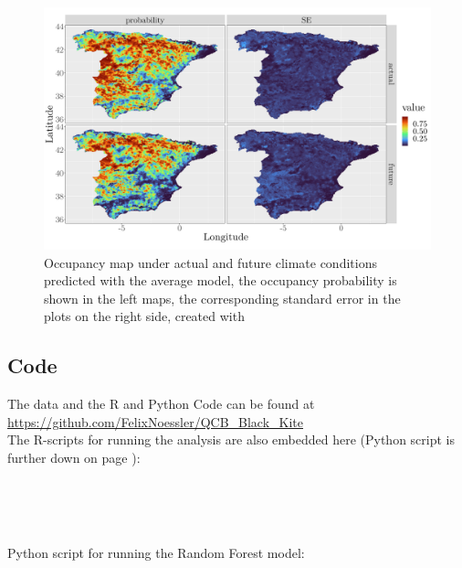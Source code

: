 \documentclass[12pt]{scrartcl} %
\begin{document}
\begin{figure}[H]
	\centering
	\includegraphics[width=\linewidth]{img/avg_model_map}
	\caption{Occupancy map under actual and future climate conditions predicted with the average model, the occupancy probability is shown in the left maps, the corresponding standard error in the plots on the right side, created with \textcite{ggplot2}}	
	\label{fig:avg_map}
\end{figure}

\newpage
\subsection*{Code}
The data and the R and Python Code can be found at \\ \url{https://github.com/FelixNoessler/QCB_Black_Kite} \\

\noindent The R-scripts for running the analysis are also embedded here (Python script is further down on page \pageref{python-script}):

\inputminted[frame=lines,framesep=2mm,baselinestretch=1.2,fontsize=\small,linenos, bgcolor=mygray]{R}{code/1_prepare_env_data.R}

\newpage
\inputminted[frame=lines,framesep=2mm,baselinestretch=1.2,fontsize=\small,linenos, bgcolor=mygray]{R}{code/2_join_species_env_data.R}

\newpage
\inputminted[frame=lines,framesep=2mm,baselinestretch=1.2,fontsize=\small,linenos, bgcolor=mygray]{R}{code/3_selection_of_covariates.R}

\newpage
\inputminted[frame=lines,framesep=2mm,baselinestretch=1.2,fontsize=\small,linenos, bgcolor=mygray]{R}{code/4_run_models.R}

\newpage
\inputminted[frame=lines,framesep=2mm,baselinestretch=1.2,fontsize=\small,linenos, bgcolor=mygray]{R}{code/5_plotting.R}

\newpage
\noindent Python script for running the Random Forest model: \label{python-script}
\inputminted[frame=lines,framesep=2mm,baselinestretch=1.2,bgcolor=mygray,fontsize=\small,linenos]{Python}{code/rf.py}



	
\end{document}
